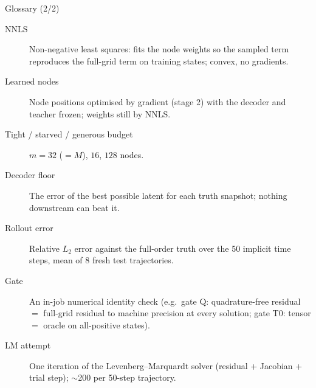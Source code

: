 \documentclass[10pt,aspectratio=169]{beamer}
\begin{document}
\begin{frame}{Glossary (2/2)}
  \small
  \begin{description}
    \item[NNLS] Non-negative least squares: fits the node weights so the sampled term reproduces the full-grid term on training states; convex, no gradients.
    \item[Learned nodes] Node positions optimised by gradient (stage 2) with the decoder and teacher frozen; weights still by NNLS.
    \item[Tight / starved / generous budget] $m=32$ ($=M$), $16$, $128$ nodes.
    \item[Decoder floor] The error of the best possible latent for each truth snapshot; nothing downstream can beat it.
    \item[Rollout error] Relative $L_2$ error against the full-order truth over the 50 implicit time steps, mean of 8 fresh test trajectories.
    \item[Gate] An in-job numerical identity check (e.g.\ gate Q: quadrature-free residual $=$ full-grid residual to machine precision at every solution; gate T0: tensor $=$ oracle on all-positive states).
    \item[LM attempt] One iteration of the Levenberg--Marquardt solver (residual + Jacobian + trial step); $\sim$200 per 50-step trajectory.
  \end{description}
\end{frame}
\end{document}
